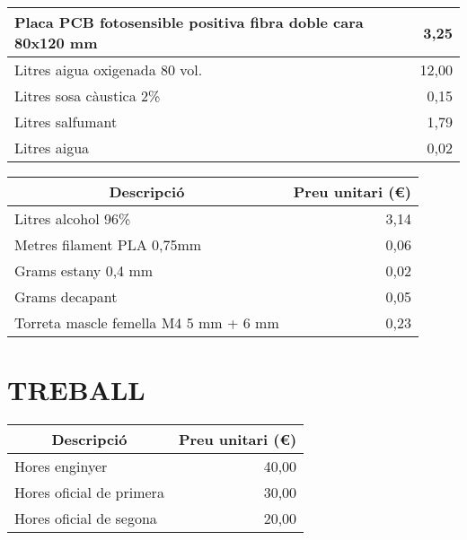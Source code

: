 \begin{table}[H]
\begin{center}
\begin{tabularx} {\textwidth} {|X|r|}
    
    Placa PCB fotosensible positiva fibra doble cara 80x120 mm  & 3,25 \\ \hline
    
    Litres aigua oxigenada 80 vol. & 12,00 \\ \hline
    Litres sosa càustica 2\% & 0,15 \\ \hline
    Litres salfumant & 1,79 \\ \hline
    Litres aigua & 0,02 \\ \hline

    
    \end{tabularx}%
  \end{center}

  \label{tab:addlabel}%
\end{table}%


\begin{table}[H]
  \begin{center}
    \begin{tabularx} {\textwidth} {|X|r|} \hline
  \multicolumn{1}{|c|}{Descripció} &  \multicolumn{1}{c|}{Preu unitari (€)}\\ \hline \hline
    Litres alcohol 96\% & 3,14 \\ \hline
    
    Metres filament PLA 0,75mm & 0,06 \\ \hline
    
    Grams estany 0,4 mm & 0,02 \\ \hline
    Grams decapant & 0,05 \\ \hline
    Torreta mascle femella M4 5 mm + 6 mm & 0,23 \\ \hline
    \end{tabularx}%
  \end{center}

  \label{tab:addlabel}%
\end{table}%



\section{\uppercase{Treball}}
\begin{table}[H]
  \begin{center}
    \begin{tabularx} {\textwidth} {|X|r|} \hline
  \multicolumn{1}{|c|}{Descripció} &  \multicolumn{1}{c|}{Preu unitari (€)}\\ \hline \hline
Hores enginyer & 40,00 \\ \hline
Hores oficial de primera & 30,00 \\ \hline
Hores oficial de segona & 20,00 \\ \hline
    \end{tabularx}%
  \end{center}

  \label{tab:addlabel}%
\end{table}%



\clearpage

